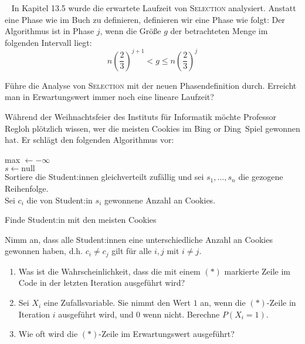 \documentclass{uebung_cs}
\begin{document}
\begin{aufgabe}\
	In Kapitel 13.5 wurde die erwartete Laufzeit von \textsc{Selection} analysiert.
	Anstatt eine Phase wie im Buch zu definieren, definieren wir eine Phase wie folgt:
	Der Algorithmus ist in Phase $j$, wenn die Größe $g$ der betrachteten Menge im folgenden Intervall liegt:
	\[n\left(\frac{2}{3}\right)^{j+1} < g \leq n\left(\frac{2}{3}\right)^j \]
	
	Führe die Analyse von \textsc{Selection} mit der neuen Phasendefinition durch. Erreicht man in Erwartungswert immer noch eine lineare Laufzeit?
\end{aufgabe}    

\begin{aufgabe}[Weihnachtsfeier im Institut]
	Während der Weihnachtsfeier des Instituts für Informatik möchte Professor Regloh plötzlich wissen, wer die meisten Cookies im \glqq Bing or Ding\grqq{}~Spiel gewonnen hat. Er schlägt den folgenden Algorithmus vor:
	
	\begin{algorithm}[H]
		\SetAlgoLined
		max $\gets -\infty$\\
		$s \gets \text{null}$\\
		Sortiere die Student:innen gleichverteilt zufällig und sei $s_1,\dots,s_n$ die gezogene Reihenfolge.\\
		Sei $c_i$ die von Student:in $s_i$ gewonnene Anzahl an Cookies.\\
		\caption{Finde Student:in mit den meisten Cookies}
\end{algorithm}
	
	Nimm an, dass alle Student:innen eine unterschiedliche Anzahl an Cookies gewonnen haben, d.h. $c_i \neq c_j$ gilt für alle $i,j$ mit $i \neq j$.
	\begin{enumerate}
		\item Was ist die Wahrscheinlichkeit, dass die mit einem $(\ast)$ markierte Zeile im Code in der letzten Iteration ausgeführt wird?\\
		\item Sei $X_i$ eine Zufallsvariable. Sie nimmt den Wert $1$ an, wenn die $(\ast)$-Zeile in Iteration $i$ ausgeführt wird, und $0$ wenn nicht. Berechne $P(X_i = 1)$.\\%
		\item Wie oft wird die $(\ast)$-Zeile im Erwartungswert ausgeführt?
	\end{enumerate}
\end{aufgabe}
\end{document}
